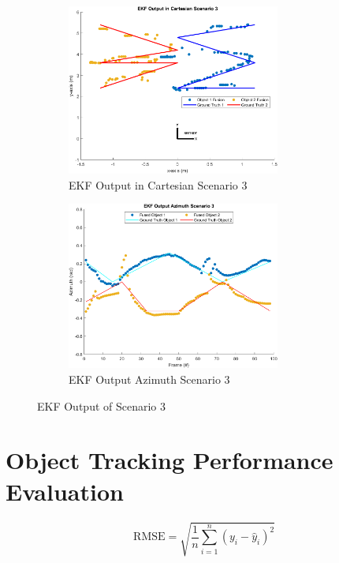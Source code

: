 \begin{figure}[!htb]
    \hspace{0.1\textwidth}
    \begin{subfigure}[b]{0.3\textwidth}%
        \includegraphics[width=7cm]{Figures/matlab/EKF Output in Cartesian Scenario 3.png}
        \caption{EKF Output in Cartesian Scenario 3}
        \label{subfig:ekf_cart_3}
    \end{subfigure}
    \hspace{0.15\textwidth}
    \begin{subfigure}[b]{0.3\textwidth}%
        \includegraphics[width=7cm]{Figures/matlab/EKF Output Azimuth Scenario 3.png}
        \caption{EKF Output Azimuth Scenario 3}
        \label{subfig:ekf_azi_3}
    \end{subfigure}

    \caption{EKF Output of Scenario 3}
    \label{fig:ekf_3}
\end{figure}


\newpage



\section{Object Tracking Performance Evaluation}\label{sec:3-evaluation}
\begin{equation}\label{equ:4_RMSE}
\text{RMSE} = \sqrt{\frac{1}{n}\sum_{i=1}^{n}(y_i - \hat{y}_i)^2}
\end{equation}

